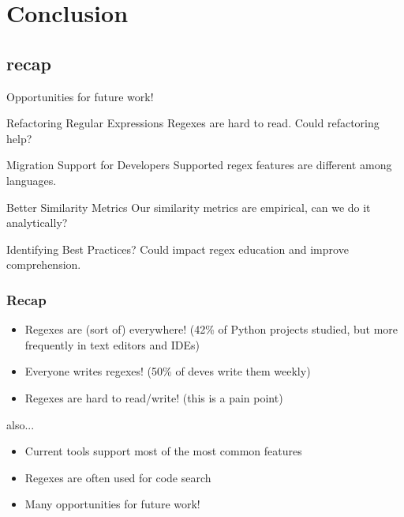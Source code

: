\section{Conclusion}
\subsection{recap}


\begin{frame}{Opportunities for future work!}


\begin{block}{Refactoring Regular Expressions}
Regexes are hard to read. Could refactoring help? 
\end{block}


\begin{block}{Migration Support for Developers}
Supported regex features are different among languages.
\end{block}


\begin{block}{Better Similarity Metrics}
Our similarity metrics are empirical, can we do it analytically?
\end{block}


\begin{block}{Identifying Best Practices?}
Could impact regex education and improve comprehension. 
\end{block}

\end{frame}

\begin{frame}
\frametitle{Recap}

\begin{itemize}
\item Regexes are (sort of) everywhere! (42\% of Python projects studied, but more frequently in text editors and IDEs)
\item<2-> Everyone writes regexes! (50\% of  deves write them weekly)
\item<3-> Regexes are hard to read/write! (this is a pain point)
\end{itemize}

also...

\begin{itemize}
\item Current tools support most of the most common features
\item Regexes are often used for code search
\item Many opportunities for future work!
\end{itemize}


\end{frame}


